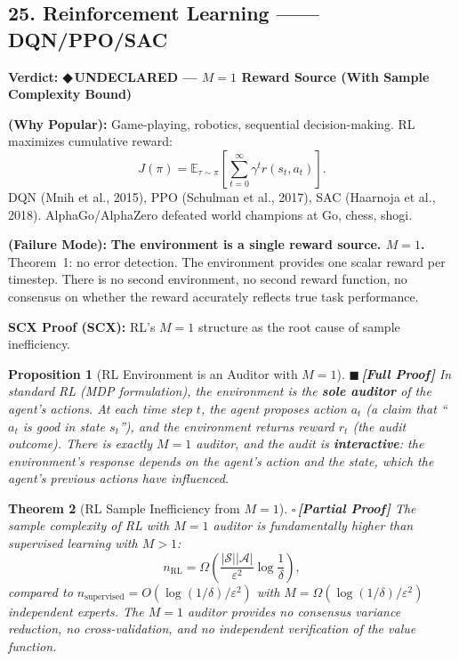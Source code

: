 \documentclass[12pt,a4paper]{article}
\newtheorem{theorem}{Theorem}[section]
\newtheorem{proposition}[theorem]{Proposition}
\theoremstyle{definition}
\newcommand{\rigorFull}{{\color{rigorcolor}$\blacksquare$\,\textbf{[Full Proof]}}}
\newcommand{\rigorPartial}{{\color{rigorcolor}$\square$\,\textbf{[Partial Proof]}}}
\newcommand{\guilty}{{\color{guiltycolor}\textbf{◆\,UNDECLARED}}}
\newcommand{\E}{\mathbb{E}}
\newcommand{\cA}{\mathcal{A}}
\newcommand{\cS}{\mathcal{S}}
\newcommand{\auditHeader}[1]{\medskip\noindent\textbf{\large #1}\medskip}
\newcommand{\whyPopular}{\noindent\textbf{ (Why Popular):} }
\newcommand{\whyFail}{\noindent\textbf{ (Failure Mode):} }
\newcommand{\scxProof}{\noindent\textbf{SCX Proof (SCX):} }
\begin{document}
\subsection{25. Reinforcement Learning ——DQN/PPO/SAC}

\auditHeader{Verdict: \guilty{} — $M=1$ Reward Source (With Sample Complexity Bound)}

\whyPopular{} Game-playing, robotics, sequential decision-making. RL maximizes cumulative reward:
\[
J(\pi) = \E_{\tau \sim \pi}\left[\sum_{t=0}^\infty \gamma^t r(s_t, a_t)\right].
\]
DQN (Mnih et al., 2015), PPO (Schulman et al., 2017), SAC (Haarnoja et al., 2018). AlphaGo/AlphaZero defeated world champions at Go, chess, shogi.

\whyFail{} \textbf{The environment is a single reward source. $M=1$.} Theorem~1: no error detection. The environment provides one scalar reward per timestep. There is no second environment, no second reward function, no consensus on whether the reward accurately reflects true task performance.

\scxProof{} RL's $M=1$ structure as the root cause of sample inefficiency.

\begin{proposition}[RL Environment is an Auditor with $M=1$]\label{prop:rl_auditor}
\rigorFull
In standard RL (MDP formulation), the environment is the \textbf{sole auditor} of the agent's actions. At each time step $t$, the agent proposes action $a_t$ (a claim that ``$a_t$ is good in state $s_t$''), and the environment returns reward $r_t$ (the audit outcome). There is exactly $M=1$ auditor, and the audit is \textbf{interactive}: the environment's response depends on the agent's action and the state, which the agent's previous actions have influenced.
\end{proposition}

\begin{theorem}[RL Sample Inefficiency from $M=1$]\label{thm:rl_sample}
\rigorPartial
The sample complexity of RL with $M=1$ auditor is fundamentally higher than supervised learning with $M>1$:
\begin{equation}\label{eq:rl_sample_complexity}
    n_{\text{RL}} = \Omega\left(\frac{|\cS||\cA|}{\varepsilon^2} \log\frac{1}{\delta}\right),
\end{equation}
compared to $n_{\text{supervised}} = O(\log(1/\delta) / \varepsilon^2)$ with $M = \Omega(\log(1/\delta) / \varepsilon^2)$ independent experts. The $M=1$ auditor provides no consensus variance reduction, no cross-validation, and no independent verification of the value function.
\end{theorem}
\end{document}

